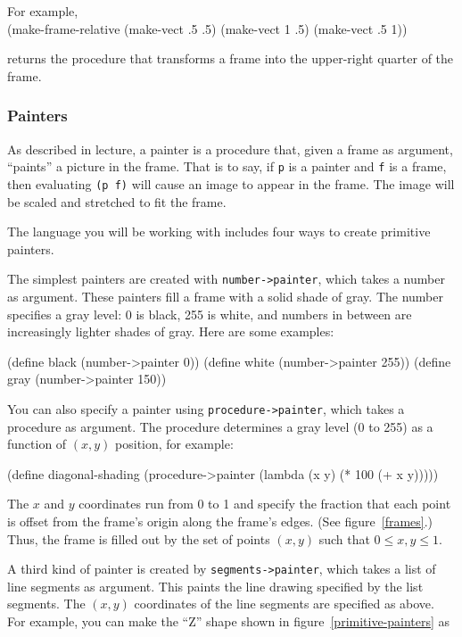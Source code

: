 \noindent
For example,\\
\beginlisp
(make-frame-relative (make-vect .5 .5) (make-vect 1 .5) (make-vect .5 1))
\endlisp

\noindent
returns the procedure that transforms a frame into the upper-right
quarter of the frame.

\subsubsection{Painters}

As described in lecture, a painter is a procedure that, given a frame
as argument, ``paints'' a picture in the frame.  That is to say, if
{\tt p} is a painter and {\tt f} is a frame, then evaluating {\tt (p
f)} will cause an image to appear in the frame.  The image will be
scaled and stretched to fit the frame.

The language you will be working with includes four ways to create
primitive painters.

The simplest painters are created with {\tt number->painter}, which
takes a number as argument.  These painters fill a frame with a solid
shade of gray.  The number specifies a gray level: 0 is black, 255 is
white, and numbers in between are increasingly lighter shades of
gray.  Here are some examples:

\beginlisp
(define black (number->painter 0))
(define white (number->painter 255))
(define gray (number->painter 150))
\endlisp

\noindent
You can also specify a painter using {\tt procedure->painter}, which
takes a procedure as argument.  The procedure determines a gray level
(0 to 255) as a function of $(x,y)$ position, for example:

\beginlisp
(define diagonal-shading
  (procedure->painter (lambda (x y) (* 100 (+ x y)))))
\endlisp

\noindent
The $x$ and $y$ coordinates run from 0 to 1 and specify the fraction
that each point is offset from the frame's origin along the frame's
edges.  (See figure~\ref{frames}.) Thus, the frame is filled out by
the set of points $(x,y)$ such that $0\leq x,y \leq 1$.

A third kind of painter is created by {\tt segments->painter}, which
takes a list of line segments as argument.  This paints the line
drawing specified by the list segments.  The $(x,y)$ coordinates of
the line segments are specified as above.  For example, you can make
the ``Z'' shape shown in figure~\ref{primitive-painters} as

